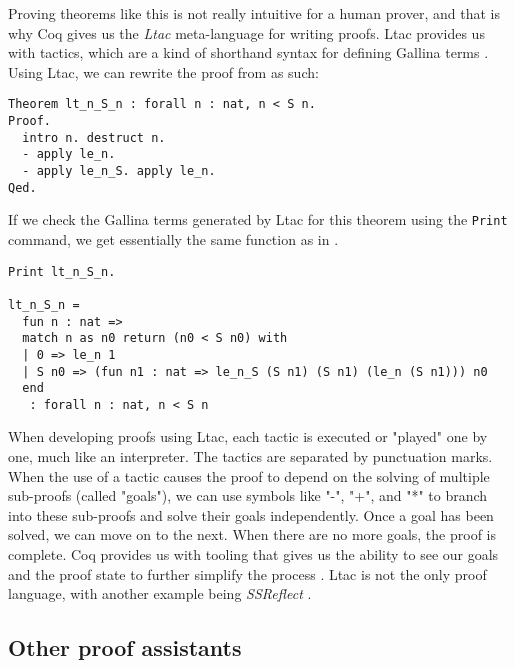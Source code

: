 Proving theorems like this is not really intuitive for a human prover,
and that is why Coq gives us the \emph{Ltac} meta-language for writing proofs.
Ltac provides us with tactics, which are a kind of shorthand syntax for defining Gallina terms \cite{cltac}.
Using Ltac, we can rewrite the proof from  as such:

\begin{minipage}{\linewidth}
\begin{lstlisting}[language=Coq, label={lst:ltac_ex}, caption={Example of Ltac syntax}]
Theorem lt_n_S_n : forall n : nat, n < S n.
Proof.
  intro n. destruct n.
  - apply le_n.
  - apply le_n_S. apply le_n.
Qed.
\end{lstlisting}
\end{minipage}

If we check the Gallina terms generated by Ltac for this theorem using the \lstinline{Print} command,
we get essentially the same function as in .

\begin{minipage}{\linewidth}
\begin{lstlisting}[language=Coq, label={lst:ltac_ex_printed}, caption={Gallina terms generated by Ltac example}]
Print lt_n_S_n.

lt_n_S_n =
  fun n : nat =>
  match n as n0 return (n0 < S n0) with
  | 0 => le_n 1
  | S n0 => (fun n1 : nat => le_n_S (S n1) (S n1) (le_n (S n1))) n0
  end
   : forall n : nat, n < S n
\end{lstlisting}
\end{minipage}

When developing proofs using Ltac, each tactic is executed or "played" one by one,
much like an interpreter. The tactics are separated by punctuation marks.
When the use of a tactic causes the proof to depend on the solving of multiple sub-proofs (called "goals"),
we can use symbols like "-", "+", and "*" to branch into these sub-proofs and solve their goals independently.
Once a goal has been solved, we can move on to the next. When there are no more goals, the proof is complete.
Coq provides us with tooling that gives us the ability to see our goals and the proof state
to further simplify the process \cite{cide}.
Ltac is not the only proof language, with another example being \emph{SSReflect} \cite{cssr}.

\subsection{Other proof assistants}
\label{ssec:other_proof_assistants}

